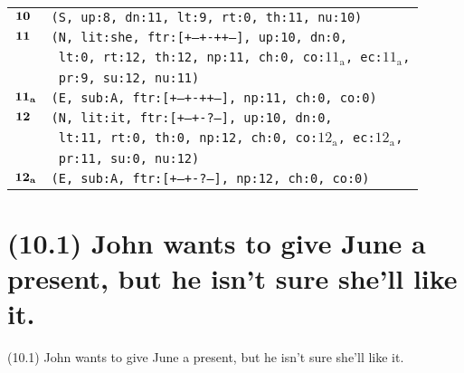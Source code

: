 \documentclass{article}
\begin{document}
\begin{minipage}{\textwidth}
{\begin{tabular}{|r|l|}
    ${\textbf{\textrm{10}}_{\phantom{z}}}$ & \texttt{\texttt{(S,~up:8,~dn:11,~lt:9,~rt:0,~th:11,~nu:10)}} \\
    ${\textbf{\textrm{11}}_{\phantom{z}}}$ & \texttt{\texttt{(N,~lit:she,~ftr:[+--+-++--],~up:10,~dn:0,}} \\
    & \texttt{\texttt{~lt:0,~rt:12,~th:12,~np:11,~ch:0,~co:${\textrm{11}_{\textrm{a}}}$,~ec:${\textrm{11}_{\textrm{a}}}$,}} \\
    & \texttt{\texttt{~pr:9,~su:12,~nu:11)}} \\
    ${\textbf{\textrm{11}}_{\textbf{\textrm{a}}}}$ & \texttt{\texttt{(E,~sub:A,~ftr:[+--+-++--],~np:11,~ch:0,~co:0)}} \\
    ${\textbf{\textrm{12}}_{\phantom{z}}}$ & \texttt{\texttt{(N,~lit:it,~ftr:[+--+-?---],~up:10,~dn:0,}} \\
    & \texttt{\texttt{~lt:11,~rt:0,~th:0,~np:12,~ch:0,~co:${\textrm{12}_{\textrm{a}}}$,~ec:${\textrm{12}_{\textrm{a}}}$,}} \\
    & \texttt{\texttt{~pr:11,~su:0,~nu:12)}} \\
    ${\textbf{\textrm{12}}_{\textbf{\textrm{a}}}}$ & \texttt{\texttt{(E,~sub:A,~ftr:[+--+-?---],~np:12,~ch:0,~co:0)}} \\
    \hline
  \end{tabular}
  }
\end{minipage}
\bigbreak

\clearpage

%
%

\section*{(10.1) John wants to give June a present, but he isn't sure she’ll like it.}

\bigbreak
\begin{enumerate*}
\item[(10.1)] John wants to give June a present, but he isn't sure she’ll like it.
\end{enumerate*}
\bigbreak
\end{document}
